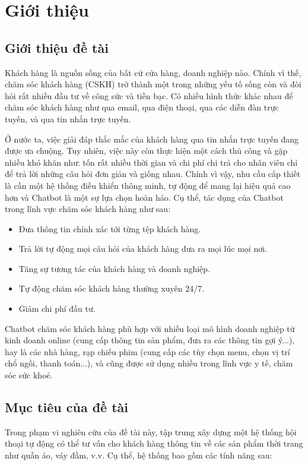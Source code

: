 \chapter {Giới thiệu}
	
\section{Giới thiệu đề tài}
Khách hàng là nguồn sống của bất cứ cửa hàng, doanh nghiệp nào. Chính vì thế, chăm sóc khách hàng (CSKH) trở thành một trong những yếu tố sống còn và đòi hỏi rất nhiều đầu tư về công sức và tiền bạc. Có nhiều hình thức khác nhau để chăm sóc khách hàng như qua email, qua điện thoại, qua các diễn đàn trực tuyến, và qua tin nhắn trực tuyến.

Ở nước ta, việc giải đáp thắc mắc của khách hàng qua tin nhắn trực tuyến đang được ưa chuộng. Tuy nhiên, việc này còn thực hiện một cách thủ công và gặp nhiều khó khăn như: tốn rất nhiều thời gian và chi phí chi trả cho nhân viên chỉ để trả lời những câu hỏi đơn giản và giống nhau. Chính vì vậy, nhu cầu cấp thiết là cần một hệ thống điều khiển thông minh, tự động để mang lại hiệu quả cao hơn và Chatbot là một sự lựa chọn hoàn hảo. Cụ thể, tác dụng của Chatbot trong lĩnh vực chăm sóc khách hàng như sau:

\begin{itemize}
    \item Đưa thông tin chính xác tới từng tệp khách hàng.
    \item Trả lời tự động mọi câu hỏi của khách hàng đưa ra mọi lúc mọi nơi.
    \item Tăng sự tương tác của khách hàng và doanh nghiệp.
    \item Tự động chăm sóc khách hàng thường xuyên 24/7.
    \item Giảm chi phí đầu tư.
\end{itemize}

Chatbot chăm sóc khách hàng phù hợp với nhiều loại mô hình doanh nghiệp từ kinh doanh online (cung cấp thông tin sản phẩm, đưa ra các thông tin gợi ý...), hay là các nhà hàng, rạp chiếu phim (cung cấp các tùy chọn menu, chọn vị trí chổ ngồi, thanh toán...), và cũng được sử dụng nhiều trong lĩnh vực y tế, chăm sóc sức khoẻ.

\section{Mục tiêu của đề tài}
\label{sec:muctieu}
Trong phạm vi nghiên cứu của đề tài này, tập trung xây dựng một hệ thống hội thoại tự động có thể tư vấn cho khách hàng thông tin về các sản phẩm thời trang như quần áo, váy đầm, v.v. Cụ thể, hệ thống bao gồm các tính năng sau:


